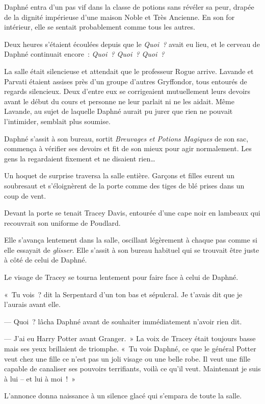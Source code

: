 Daphné entra d'un pas vif dans la classe de potions sans révéler sa peur, drapée de la dignité impérieuse d'une maison Noble et Très Ancienne. En son for intérieur, elle se sentait probablement comme tous les autres.

Deux heures s'étaient écoulées depuis que le \emph{Quoi~?} avait eu lieu, et le cerveau de Daphné continuait encore~: \emph{Quoi~? Quoi~? Quoi~?}

La salle était silencieuse et attendait que le professeur Rogue arrive. Lavande et Parvati étaient assises près d'un groupe d'autres Gryffondor, tous entourés de regards silencieux. Deux d'entre eux se corrigeaient mutuellement leurs devoirs avant le début du cours et personne ne leur parlait ni ne les aidait. Même Lavande, au sujet de laquelle Daphné aurait pu jurer que rien ne pouvait l'intimider, semblait plus soumise.

Daphné s'assit à son bureau, sortit \emph{Breuvages et Potions Magiques} de son sac, commença à vérifier ses devoirs et fit de son mieux pour agir normalement. Les gens la regardaient fixement et ne disaient rien…

Un hoquet de surprise traversa la salle entière. Garçons et filles eurent un soubresaut et s'éloignèrent de la porte comme des tiges de blé prises dans un coup de vent.

Devant la porte se tenait Tracey Davis, entourée d'une cape noir en lambeaux qui recouvrait son uniforme de Poudlard.

Elle s'avança lentement dans la salle, oscillant légèrement à chaque pas comme si elle essayait de \emph{glisser}. Elle s'assit à son bureau habituel qui se trouvait être juste à côté de celui de Daphné.

Le visage de Tracey se tourna lentement pour faire face à celui de Daphné.

«~Tu vois~? dit la Serpentard d'un ton bas et sépulcral. Je t'avais dit que je l'aurais avant elle.

--- Quoi~? lâcha Daphné avant de souhaiter immédiatement n'avoir rien dit.

--- J'ai eu Harry Potter avant Granger.~» La voix de Tracey était toujours basse mais ses yeux brillaient de triomphe. «~Tu vois Daphné, ce que le général Potter veut chez une fille ce n'est pas un joli visage ou une belle robe. Il veut une fille capable de canaliser ses pouvoirs terrifiants, voilà ce qu'il veut. Maintenant je suis à lui -- et lui à moi~!~»

L'annonce donna naissance à un silence glacé qui s'empara de toute la salle.

